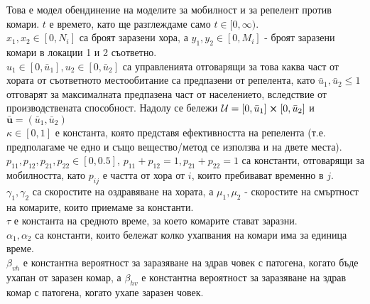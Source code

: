 Това е модел обендинение на моделите за мобилност и за репелент против комари.
$t$ е времето, като ще разглеждаме само $t \in [0, \infty)$. \\
$x_1, x_2 \in [0, N_i]$ са броят заразени хора, а $y_1, y_2 \in [0, M_i]$ - броят заразени комари в локации 1 и 2 съответно. \\
$u_1 \in [0, \bar{u}_1], u_2 \in [0, \bar{u}_2]$ са управленията отговарящи за това каква част от хората от съответното местообитание са предпазени от репелента, като $ \bar{u}_1, \bar{u}_2 \leq 1 $ отговарят за максималната предпазена част от населението, вследствие от производствената способност. Надолу се бележи $\mathcal{U} = [0, \bar{u}_1] \cross [0, \bar{u}_2]$ и $\bar{\mathbf{u}} = (\bar{u}_1, \bar{u}_2)$ \\
$\kappa \in [0, 1]$ е константа, която представя ефективността на репелента (т.е. предполагаме че едно и също вещество/метод се използва и на двете места). \\
$p_{11}, p_{12}, p_{21}, p_{22} \in [0, 0.5]$, $p_{11} + p_{12} = 1, p_{21} + p_{22} = 1$ са константи, отговарящи за мобилността, като $p_{ij}$ е частта от хора от $i$, които пребивават временно в $j$. \\
$\gamma_1, \gamma_2$ са скоростите на оздравяване на хората, а $\mu_1, \mu_2$ - скоростите на смъртност на комарите, които приемаме за константи. \\
$\tau$ е константа на средното време, за което комарите стават заразни. \\
$\alpha_1, \alpha_2$ са константи, които бележат колко ухапвания на комари има за единица време. \\
$\beta_{vh}$ е константна вероятност за заразяване на здрав човек с патогена, когато бъде ухапан от заразен комар, а $\beta_{hv}$ е константна вероятност за заразяване на здрав комар с патогена, когато ухапе заразен човек.

